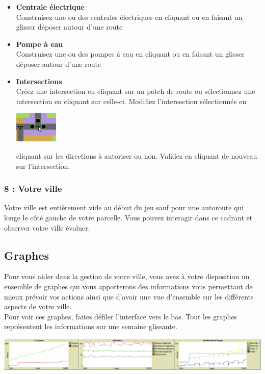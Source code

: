 \documentclass[11pt]{report}
\begin{document}
\begin{itemize}
	\item \textbf{Centrale électrique}\\
	Construisez une ou des centrales électriques en cliquant ou en faisant un glisser déposer autour d'une route
	
	\item \textbf{Pompe à eau}\\
	Construisez une ou des pompes à eau en cliquant ou en faisant un glisser déposer autour d'une route
	
	\item
	\begin{minipage}{0.75\textwidth}
		\textbf{Intersections}\\
	Créez une intersection en cliquant sur un patch de route ou sélectionnez une intersection en cliquant sur celle-ci. Modifiez l'intersection sélectionnée en
	\end{minipage}
	\begin{minipage}{0.2\textwidth}
		\begin{flushright}
			\includegraphics[height=55px]{intersection_edit}
		\end{flushright}
	\end{minipage}
	cliquant sur les directions à autoriser ou non. Validez en cliquant de nouveau sur l'intersection.
\end{itemize}

\subsubsection{8 : Votre ville}
Votre ville est entièrement vide au début du jeu sauf pour une autoroute qui longe le côté gauche de votre parcelle.
Vous pouvez interagir dans ce cadrant et observer votre ville évoluer.



\newpage
\subsection{Graphes}
Pour vous aider dans la gestion de votre ville, vous avez à votre disposition un ensemble de graphes qui vous apporterons des informations vous permettant de mieux prévoir vos actions ainsi que d'avoir une vue d'ensemble sur les différents aspects de votre ville.\\
Pour voir ces graphes, faites défiler l'interface vers le bas.
Tout les graphes représentent les informations sur une semaine glissante.
\begin{center}
	\includegraphics[width=\textwidth]{graphs}
\end{center}
\end{document}
